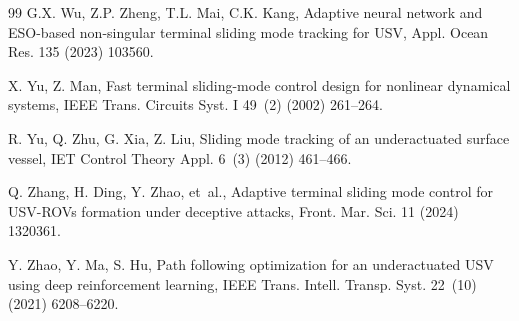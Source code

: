 \documentclass[review]{cas-dc}
\begin{document}
\begin{thebibliography}{99}
G.X. Wu, Z.P. Zheng, T.L. Mai, C.K. Kang, Adaptive neural network and ESO-based non-singular terminal sliding mode tracking for USV, Appl. Ocean Res. 135 (2023) 103560.

X. Yu, Z. Man, Fast terminal sliding-mode control design for nonlinear dynamical systems, IEEE Trans. Circuits Syst. I 49~(2) (2002) 261--264.

R. Yu, Q. Zhu, G. Xia, Z. Liu, Sliding mode tracking of an underactuated surface vessel, IET Control Theory Appl. 6~(3) (2012) 461--466.

Q. Zhang, H. Ding, Y. Zhao, et~al., Adaptive terminal sliding mode control for USV-ROVs formation under deceptive attacks, Front. Mar. Sci. 11 (2024) 1320361.

Y. Zhao, Y. Ma, S. Hu, Path following optimization for an underactuated USV using deep reinforcement learning, IEEE Trans. Intell. Transp. Syst. 22~(10) (2021) 6208--6220.

\end{thebibliography}


\end{document}
